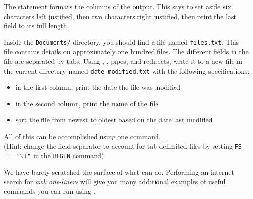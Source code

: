 The statement  formats the columns of the output.
This says to set aside six characters left justified, then two characters right justified, then print the last field to its full length.

\begin{problem}
Inside the \texttt{Documents/} directory, you should find a file named \texttt{files.txt}.
This file contains details on approximately one hundred files.
The different fields in the file are separated by tabs.
Using , , pipes, and redirects, write it to a new file in the current directory named \texttt{date\_modified.txt} with the following specifications:
\begin{itemize}
\item in the first column, print the date the file was modified
\item in the second column, print the name of the file
\item sort the file from newest to oldest based on the date last modified
\end{itemize}
All of this can be accomplished using one command.
\\(Hint: change the field separator to account for tab-delimited files by setting \texttt{FS $=$ "$\backslash$t"} in the \texttt{BEGIN} command)
\end{problem}

\begin{comment}
\begin{problem}
The \texttt{people\_info.txt} file contains a list of info about specific people.
Each person has a gender, occupation, name, and age.
Listed in that order.

The formatting in this file is a little different, because each piece of info is separated by a comma instead of a space.
Using what you learned in the previous discussion, as an awk command to format the data as follows; \emph{gender,age,name,occupation}, with the gender left justified, the age right, the name left, and the occupation printed to its full length. 
Note that the names in this file are no longer than six letters.
Write the results of your command to a different file called \texttt{people\_formatted.txt}.
\\(Hint: To change the field separator change the \texttt{FS $=$} part of the command. )
\end{problem}
\end{comment}

We have barely scratched the surface of what  can do.
Performing an internet search for \href{https://www.google.com/search?q=awk+one-liners&oq=awk+one-liners&aqs=chrome..69i57j0l7.3924j0j7&sourceid=chrome&ie=UTF-8}{\emph{awk one-liners}} will give you many additional examples of useful commands you can run using .


